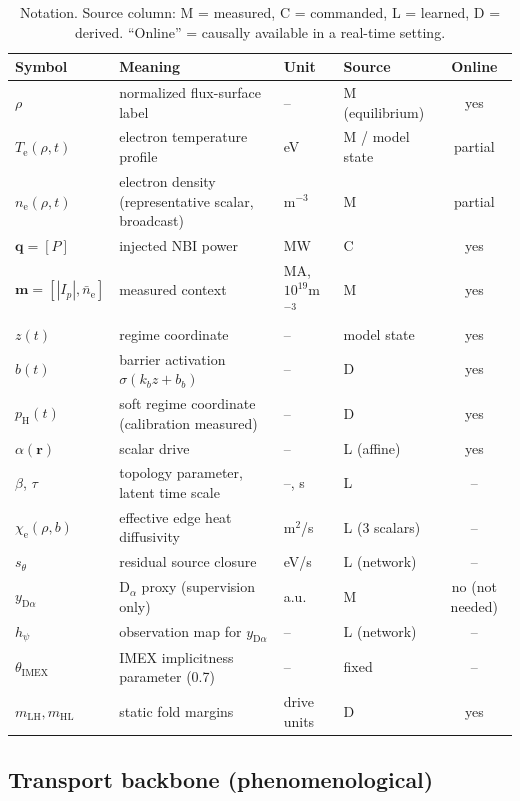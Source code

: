 \documentclass[11pt]{article}
\newcommand{\Te}{T_{\mathrm{e}}}
\newcommand{\nel}{n_{\mathrm{e}}}
\newcommand{\lat}{z}
\newcommand{\dr}{\alpha}
\newcommand{\ctrlq}{\bm{q}}
\newcommand{\ctxm}{\bm{m}}
\newcommand{\inr}{\bm{r}}
\newcommand{\yD}{y_{\mathrm{D}\alpha}}
\newcommand{\pH}{p_{\mathrm{H}}}
\newcommand{\bact}{b}
\newcommand{\chie}{\chi_{\mathrm{e}}}
\newcommand{\thIMEX}{\theta_{\mathrm{IMEX}}}
\newcommand{\mLH}{m_{\mathrm{LH}}}
\newcommand{\mHL}{m_{\mathrm{HL}}}
\begin{document}
\begin{table}[t]
\centering\small
\caption{Notation. Source column: M = measured, C = commanded, L =
learned, D = derived. ``Online'' = causally available in a real-time
setting.}
\label{tab:notation}
\begin{tabular}{llllc}
\toprule
Symbol & Meaning & Unit & Source & Online \\
\midrule
$\rho$ & normalized flux-surface label & -- & M (equilibrium) & yes \\
$\Te(\rho,t)$ & electron temperature profile & eV & M / model state & partial \\
$\nel(\rho,t)$ & electron density (representative scalar, broadcast) & m$^{-3}$ & M & partial \\
$\ctrlq = [P]$ & injected NBI power & MW & C & yes \\
$\ctxm = [|I_p|, \bar\nel]$ & measured context & MA, $10^{19}$m$^{-3}$ & M & yes \\
$\lat(t)$ & regime coordinate & -- & model state & yes \\
$\bact(t)$ & barrier activation $\sigma(k_b \lat + b_b)$ & -- & D & yes \\
$\pH(t)$ & soft regime coordinate (calibration measured) & -- & D & yes \\
$\dr(\inr)$ & scalar drive & -- & L (affine) & yes \\
$\beta$, $\tau$ & topology parameter, latent time scale & --, s & L & -- \\
$\chie(\rho,\bact)$ & effective edge heat diffusivity & m$^2$/s & L (3 scalars) & -- \\
$s_\theta$ & residual source closure & eV/s & L (network) & -- \\
$\yD$ & D$_\alpha$ proxy (supervision only) & a.u. & M & no (not needed) \\
$h_\psi$ & observation map for $\yD$ & -- & L (network) & -- \\
$\thIMEX$ & IMEX implicitness parameter (0.7) & -- & fixed & -- \\
$\mLH, \mHL$ & static fold margins & drive units & D & yes \\
\bottomrule
\end{tabular}
\end{table}

\subsection{Transport backbone (phenomenological)}
\label{sec:model-pde}
\end{document}
